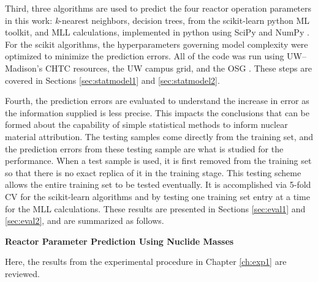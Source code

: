 Third, three algorithms are used to predict the four reactor operation
parameters in this work: \textit{k}-nearest neighbors, decision trees, from the
scikit-learn python \gls{ML} toolkit, and \gls{MLL} calculations, implemented
in python using SciPy and NumPy \cite{scikit, scipy, numpy}.  For the scikit
algorithms, the hyperparameters governing model complexity were optimized to
minimize the prediction errors.  All of the code was run using
\gls{UW}--Madison's \gls{CHTC} resources, the \gls{UW} campus grid, and the
\gls{OSG} \cite{osg07, osg09}.  These steps are covered in Sections
\ref{sec:statmodel1} and \ref{sec:statmodel2}.

Fourth, the prediction errors are evaluated to understand the increase in error
as the information supplied is less precise. This impacts the conclusions that
can be formed about the capability of simple statistical methods to inform
nuclear material attribution.  The testing samples come directly from the
training set, and the prediction errors from  these testing sample are what is
studied for the performance.  When a test sample is used, it is first removed
from the training set so that there is no exact replica of it in the training
stage.  This testing scheme allows the entire training set to be tested
eventually.  It is accomplished via 5-fold \gls{CV} for the scikit-learn
algorithms and by testing one training set entry at a time for the \gls{MLL}
calculations.  These results are presented in Sections \ref{sec:eval1} and
\ref{sec:eval2}, and are summarized as follows.

\noindent \textbf{Reactor Parameter Prediction Using Nuclide Masses}

Here, the results from the experimental procedure in Chapter \ref{ch:exp1} are
reviewed.  


